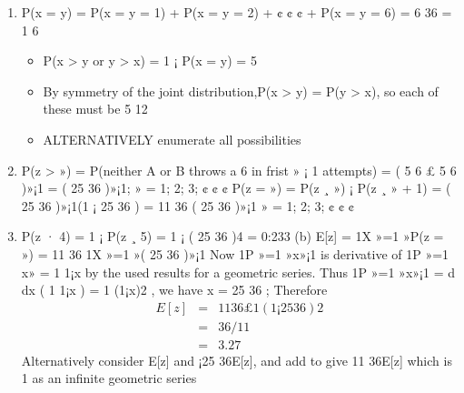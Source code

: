 \documentclass[a4paper,12pt]{article}
\begin{document}
\begin{enumerate}
    \item 
P(x = y) = P(x = y = 1) + P(x = y = 2) + ¢ ¢ ¢ + P(x = y = 6) = 6
36 = 1
6
\begin{itemize}
    \item P(x > y or y > x) = 1 ¡ P(x = y) = 5
\item By symmetry of the joint distribution,P(x > y) = P(y > x), so each of these must be
5
12
\item ALTERNATIVELY enumerate all possibilities
\end{itemize}

\item 
P(z > ») = P(neither A or B throws a 6 in frist » ¡ 1 attempts)
= ( 5
6 £ 5
6 )»¡1 = ( 25
36 )»¡1; » = 1; 2; 3; ¢ ¢ ¢
P(z = ») = P(z ¸ ») ¡ P(z ¸ » + 1)
= ( 25
36 )»¡1(1 ¡ 25
36 ) = 11
36 ( 25
36 )»¡1 » = 1; 2; 3; ¢ ¢ ¢
\item 
P(z · 4) = 1 ¡ P(z ¸ 5) = 1 ¡ (
25
36
)4 = 0:233
(b)
E[z] =
1X
»=1
»P(z = ») =
11
36
1X
»=1
»(
25
36
)»¡1
Now
1P
»=1
»x»¡1 is derivative of
1P
»=1
x» = 1
1¡x by the used results for a geometric series.
Thus
1P
»=1
»x»¡1 = d
dx ( 1
1¡x ) = 1
(1¡x)2 , we have x = 25
36 ;
Therefore
\begin{eqnarray}
E[z] &=& 11
36
£
1
(1 ¡ 25
36 )2 \\&=&
36/11
\\ &=& 3.27
\end{eqnarray}
Alternatively consider E[z] and ¡25
36E[z], and add to give 11
36E[z] which is 1 as an
infinite geometric series
\end{enumerate}
\end{document}
